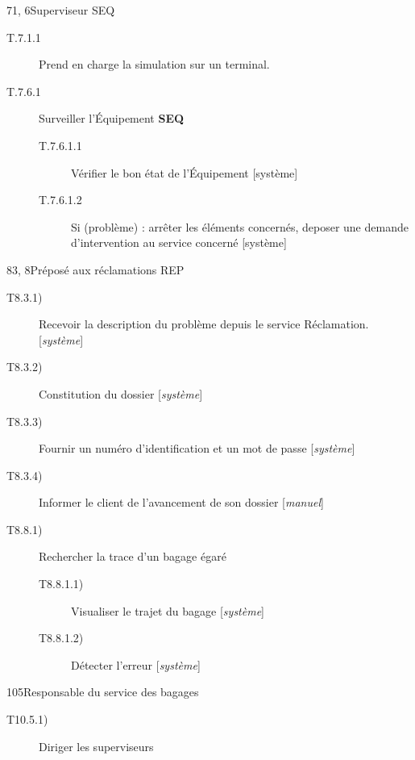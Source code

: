 {\begin{description}
\dta
{7}{1, 6}{Superviseur}
{SEQ}
{
\begin{description}
	\item[T.7.1.1] Prend en charge la simulation sur un terminal.
	
	\item[T.7.6.1] Surveiller l'Équipement \textbf{SEQ}
	\begin{description}
		\item[T.7.6.1.1] Vérifier le bon état de l'Équipement [système]
		\item[T.7.6.1.2] Si (problème) : arrêter les éléments concernés, deposer une demande d'intervention au service concerné [système]
	\end{description}
\end{description}
}

\dta
{8}{3, 8}{Préposé aux réclamations}
{REP}
{
\begin{description}
	\item [T8.3.1)] Recevoir la description du problème depuis le service \og Réclamation\fg. [\textsl{système}]
	\item [T8.3.2)] Constitution du dossier [\textsl{système}] 
	\item [T8.3.3)] Fournir un numéro d'identification et un mot de passe [\textsl{système}]
	\item [T8.3.4)] Informer le client de l'avancement de son dossier [\textsl{manuel}]

	\item [T8.8.1)] Rechercher la trace d'un bagage égaré
	\begin{description}
		\item [T8.8.1.1)] Visualiser le trajet du bagage [\textsl{système}]
		\item [T8.8.1.2)] Détecter l'erreur [\textsl{système}]
	\end{description}
\end{description}
}

\dta
{10}{5}{Responsable du service des bagages}
{
\begin{description}
	\item [T10.5.1)] Diriger les superviseurs

\end{description}
}


\end{description}}
